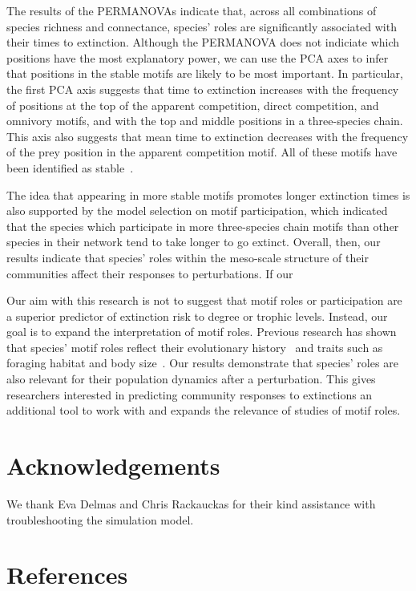 \documentclass[12pt]{article}
\begin{document}
	The results of the PERMANOVAs indicate that, across all combinations of species richness and connectance, species' roles are significantly associated with their times to extinction. Although the PERMANOVA does not indiciate which positions have the most explanatory power, we can use the PCA axes to infer that positions in the stable motifs are likely to be most important. In particular, the first PCA axis suggests that time to extinction increases with the frequency of positions at the top of the apparent competition, direct competition, and omnivory motifs, and with the top and middle positions in a three-species chain. This axis also suggests that mean time to extinction decreases with the frequency of the prey position in the apparent competition motif. All of these motifs have been identified as stable~\citep{Stouffer2007,Borrelli2015a}.

	
	The idea that appearing in more stable motifs promotes longer extinction times is also supported by the model selection on motif participation, which indicated that the species which participate in more three-species chain motifs than other species in their network tend to take longer to go extinct. Overall, then, our results indicate that species' roles within the meso-scale structure of their communities affect their responses to perturbations. If our 


	Our aim with this research is not to suggest that motif roles or participation are a superior predictor of extinction risk to degree or trophic levels. Instead, our goal is to expand the interpretation of motif roles. Previous research has shown that species' motif roles reflect their evolutionary history~\citep{} and traits such as foraging habitat and body size~\citep{Cirtwill2018EcolLett}. Our results demonstrate that species' roles are also relevant for their population dynamics after a perturbation. This gives researchers interested in predicting community responses to extinctions an additional tool to work with and expands the relevance of studies of motif roles.


\section{Acknowledgements}

	We thank Eva Delmas and Chris Rackauckas for their kind assistance with troubleshooting the simulation model. 


\section{References}
\end{document}
